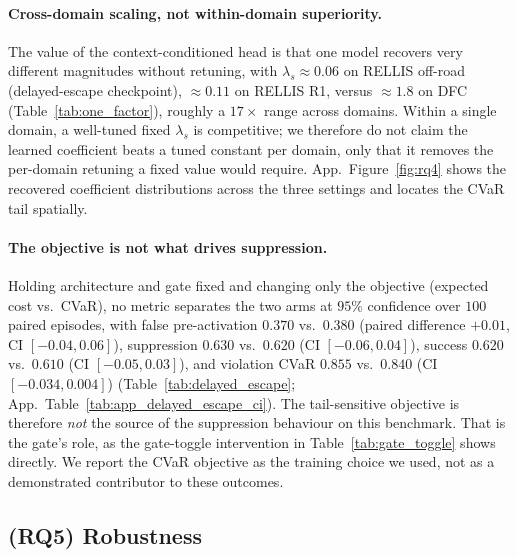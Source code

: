 \paragraph{Cross-domain scaling, not within-domain superiority.}
The value of the context-conditioned head is that one model recovers very different magnitudes without retuning, with $\lambda_s\approx0.06$ on RELLIS off-road (delayed-escape checkpoint), $\approx0.11$ on RELLIS R1, versus $\approx1.8$ on DFC (Table~\ref{tab:one_factor}), roughly a $17{\times}$ range across domains. Within a single domain, a well-tuned fixed $\lambda_s$ is competitive; we therefore do not claim the learned coefficient beats a tuned constant per domain, only that it removes the per-domain retuning a fixed value would require. App.~Figure~\ref{fig:rq4} shows the recovered coefficient distributions across the three settings and locates the CVaR tail spatially.

\paragraph{The objective is not what drives suppression.}
Holding architecture and gate fixed and changing only the objective (expected cost vs.\ CVaR), no metric separates the two arms at $95\%$ confidence over $100$ paired episodes, with false pre-activation $0.370$ vs.\ $0.380$ (paired difference $+0.01$, CI $[-0.04,0.06]$), suppression $0.630$ vs.\ $0.620$ (CI $[-0.06,0.04]$), success $0.620$ vs.\ $0.610$ (CI $[-0.05,0.03]$), and violation CVaR $0.855$ vs.\ $0.840$ (CI $[-0.034,0.004]$) (Table~\ref{tab:delayed_escape}; App.~Table~\ref{tab:app_delayed_escape_ci}). The tail-sensitive objective is therefore \emph{not} the source of the suppression behaviour on this benchmark. That is the gate's role, as the gate-toggle intervention in Table~\ref{tab:gate_toggle} shows directly. We report the CVaR objective as the training choice we used, not as a demonstrated contributor to these outcomes.

\subsection{(RQ5) Robustness}
\label{sec:exp_interpretation}

